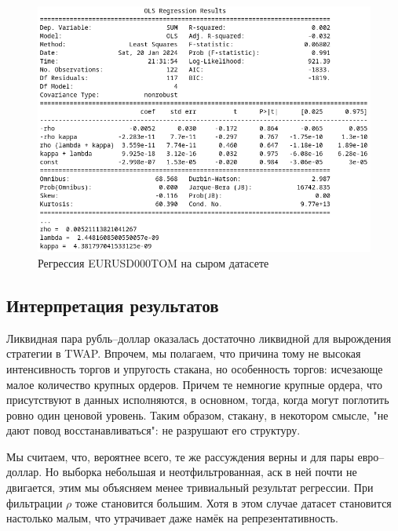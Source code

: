 \begin{figure}
    \includegraphics[scale=0.8]{fig/EURUSDregr.png}
    \caption{Регрессия EURUSD000TOM на сыром датасете}
    \label{usdeurregr}
\end{figure}

\subsection{Интерпретация результатов}

Ликвидная пара рубль--доллар оказалась достаточно ликвидной для вырождения стратегии 
в TWAP. Впрочем, мы полагаем, что причина тому не высокая интенсивность торгов и упругость стакана,
но особенность торгов: исчезающе малое количество крупных ордеров. Причем те немногие крупные ордера,
что присутствуют в данных исполняются, в основном, тогда, когда могут поглотить ровно один ценовой уровень.
Таким образом, стакану, в некотором смысле, "не дают повод восстанавливаться": не разрушают его структуру.
\par
Мы считаем, что, вероятнее всего, те же рассуждения верны и для пары евро--доллар. Но выборка небольшая и неотфильтрованная,
аск в ней почти не двигается, этим мы объясняем менее тривиальный результат регрессии. При фильтрации $\rho$ тоже становится большим.
Хотя в этом случае датасет становится настолько малым, что утрачивает даже намёк на репрезентативность.

